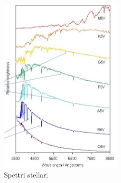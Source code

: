 \documentclass[a4paper,11pt]{article}
\begin{document}
    
      
    \begin{figure}[h!!]
        \centering
        \includegraphics[width=6cm]{stellar_spectra.jpg}
        \caption{Spettri stellari}
        \label{fig:stellar spectra}
    \end{figure}
    
\end{document}
